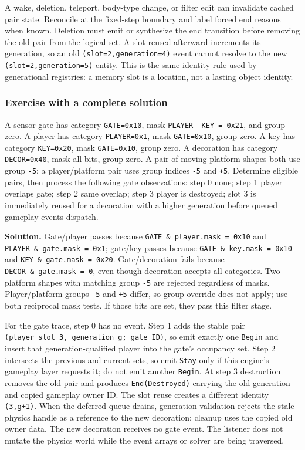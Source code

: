 A wake, deletion, teleport, body-type change, or filter edit can invalidate cached pair state. Reconcile at the fixed-step boundary and label forced end reasons when known. Deletion must emit or synthesize the end transition before removing the old pair from the logical set. A slot reused afterward increments its generation, so an old \texttt{(slot=2,generation=4)} event cannot resolve to the new \texttt{(slot=2,generation=5)} entity. This is the same identity rule used by generational registries: a memory slot is a location, not a lasting object identity.

\subsubsection{Exercise with a complete solution}\label{05-engine-i-ch017-exercise-with-a-complete-solution}

A sensor gate has category \texttt{GATE=0x10}, mask \texttt{PLAYER\ \textbar{}\ KEY\ =\ 0x21}, and group zero. A player has category \texttt{PLAYER=0x1}, mask \texttt{GATE=0x10}, group zero. A key has category \texttt{KEY=0x20}, mask \texttt{GATE=0x10}, group zero. A decoration has category \texttt{DECOR=0x40}, mask all bits, group zero. A pair of moving platform shapes both use group \texttt{-5}; a player/platform pair uses group indices \texttt{-5} and \texttt{+5}. Determine eligible pairs, then process the following gate observations: step 0 none; step 1 player overlaps gate; step 2 same overlap; step 3 player is destroyed; slot 3 is immediately reused for a decoration with a higher generation before queued gameplay events dispatch.

\textbf{Solution.} Gate/player passes because \texttt{GATE\ \&\ player.mask\ =\ 0x10} and \texttt{PLAYER\ \&\ gate.mask\ =\ 0x1}; gate/key passes because \texttt{GATE\ \&\ key.mask\ =\ 0x10} and \texttt{KEY\ \&\ gate.mask\ =\ 0x20}. Gate/decoration fails because \texttt{DECOR\ \&\ gate.mask\ =\ 0}, even though decoration accepts all categories. Two platform shapes with matching group \texttt{-5} are rejected regardless of masks. Player/platform groups \texttt{-5} and \texttt{+5} differ, so group override does not apply; use both reciprocal mask tests. If those bits are set, they pass this filter stage.

For the gate trace, step 0 has no event. Step 1 adds the stable pair \texttt{(player\ slot\ 3,\ generation\ g;\ gate\ ID)}, so emit exactly one \texttt{Begin} and insert that generation-qualified player into the gate's occupancy set. Step 2 intersects the previous and current sets, so emit \texttt{Stay} only if this engine's gameplay layer requests it; do not emit another \texttt{Begin}. At step 3 destruction removes the old pair and produces \texttt{End(Destroyed)} carrying the old generation and copied gameplay owner ID. The slot reuse creates a different identity \texttt{(3,g+1)}. When the deferred queue drains, generation validation rejects the stale physics handle as a reference to the new decoration; cleanup uses the copied old owner data. The new decoration receives no gate event. The listener does not mutate the physics world while the event arrays or solver are being traversed.

